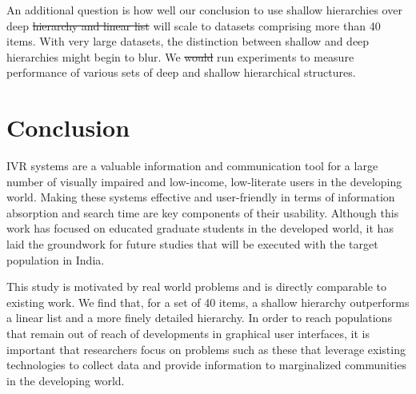 \documentclass{sigchi}
\providecommand{\DIFaddtex}[1]{{\protect\color{blue}\uwave{#1}}} %
\providecommand{\DIFdeltex}[1]{{\protect\color{red}\sout{#1}}}                      %
\providecommand{\DIFaddbegin}{} %
\providecommand{\DIFaddend}{} %
\providecommand{\DIFdelbegin}{} %
\providecommand{\DIFdelend}{} %
\providecommand{\DIFadd}[1]{\texorpdfstring{\DIFaddtex{#1}}{#1}} %
\providecommand{\DIFdel}[1]{\texorpdfstring{\DIFdeltex{#1}}{}} %
\begin{document}
An additional question is how well our conclusion to use shallow hierarchies over deep \DIFdelbegin \DIFdel{hierarchy and linear list }\DIFdelend \DIFaddbegin \DIFadd{hierarchies }\DIFaddend will scale to datasets comprising more than 40 items. With very large datasets, the distinction between shallow and deep hierarchies might begin to blur. We \DIFdelbegin \DIFdel{would }\DIFdelend \DIFaddbegin \DIFadd{will }\DIFaddend run experiments to measure performance of various sets of deep and shallow hierarchical structures.

\section{Conclusion}

IVR systems are a valuable information and communication tool for a large number of visually impaired and low-income, low-literate users in the developing world. Making these systems effective and user-friendly in terms of information absorption and search time are key components of their usability. Although this work has focused on educated graduate students in the developed world, it has laid the groundwork for future studies that will be executed with the target population in India.

This study is motivated by real world problems and is directly comparable to existing work. We find that, for a set of 40 items, a shallow hierarchy outperforms a linear list and a more finely detailed \DIFaddbegin \DIFadd{deep }\DIFaddend hierarchy. In order to reach populations that remain out of reach of developments in graphical user interfaces, it is important that researchers focus on problems such as these that leverage existing technologies to collect data and provide information to marginalized communities in the developing world. 

%
%
%
%
%
\balance



\end{document}

